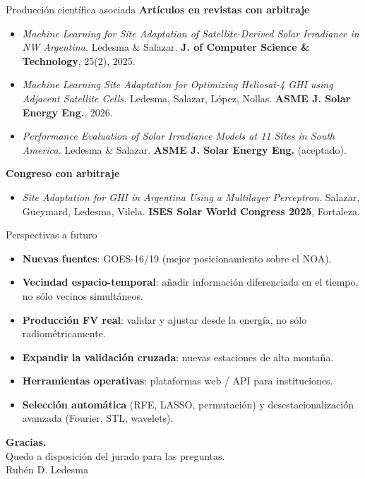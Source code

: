 \documentclass[aspectratio=169,11pt]{beamer}
\begin{document}
\begin{frame}{Producción científica asociada}
  \scriptsize
  \textbf{Artículos en revistas con arbitraje}
  \begin{itemize}
    \item \emph{Machine Learning for Site Adaptation of Satellite-Derived Solar Irradiance in NW Argentina.} Ledesma \& Salazar. \textbf{J. of Computer Science \& Technology}, 25(2), 2025.
    \item \emph{Machine Learning Site Adaptation for Optimizing Heliosat-4 GHI using Adjacent Satellite Cells.} Ledesma, Salazar, López, Nollas. \textbf{ASME J. Solar Energy Eng.}, 2026.
    \item \emph{Performance Evaluation of Solar Irradiance Models at 11 Sites in South America.} Ledesma \& Salazar. \textbf{ASME J. Solar Energy Eng.} (aceptado).
  \end{itemize}
  \textbf{Congreso con arbitraje}
  \begin{itemize}
    \item \emph{Site Adaptation for GHI in Argentina Using a Multilayer Perceptron.} Salazar, Gueymard, Ledesma, Vilela. \textbf{ISES Solar World Congress 2025}, Fortaleza.
  \end{itemize}
\end{frame}

\begin{frame}{Perspectivas a futuro}
  \footnotesize
  \begin{itemize}
    \item \textbf{Nuevas fuentes}: GOES-16/19 (mejor posicionamiento sobre el NOA).
    \item \textbf{Vecindad espacio-temporal}: añadir información diferenciada en el tiempo, no sólo vecinos simultáneos.
    \item \textbf{Producción FV real}: validar y ajustar desde la energía, no sólo radiométricamente.
    \item \textbf{Expandir la validación cruzada}: nuevas estaciones de alta montaña.
    \item \textbf{Herramientas operativas}: plataformas web / API para instituciones.
    \item \textbf{Selección automática} (RFE, LASSO, permutación) y desestacionalización avanzada (Fourier, STL, wavelets).
  \end{itemize}
\end{frame}

\begin{frame}[plain]
  \vfill\centering
  {\color{white}\Large\bfseries Gracias.}\\[0.6em]
  {\color{white}\footnotesize Quedo a disposición del jurado para las preguntas.}\\[0.01em]
  {\color{white!80}\scriptsize Rubén D. Ledesma}
  \vfill
\end{frame}
\end{document}
